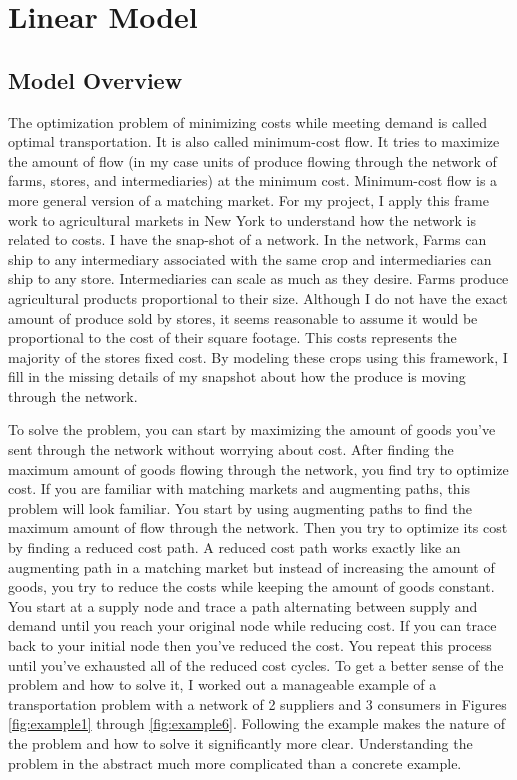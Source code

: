 \documentclass{report}
\begin{document}
\chapter{Linear Model}

\section{Model Overview}

The optimization problem of minimizing costs while meeting demand is called optimal transportation. It is also called minimum-cost flow. It tries to maximize the amount of flow (in my case units of produce flowing through the network of farms, stores, and intermediaries) at the minimum cost.  Minimum-cost flow is  a more general version of a matching market. For my project, I apply this frame work to agricultural markets in New York to understand how the network is related to costs. I have the snap-shot of a network. In the network, Farms can ship to any intermediary associated with the same crop and intermediaries can ship to any store. Intermediaries can scale as much as they desire. Farms produce agricultural products proportional to their size. Although I do not have the exact amount of produce sold by stores, it seems reasonable to assume it would be proportional to the cost of their square footage. This costs represents the majority of the stores fixed cost. By modeling these crops using this framework, I fill in the missing details of my snapshot about how the produce is moving through the network.

To solve the problem, you can start by maximizing the amount of goods you've sent through the network without worrying about cost.  After finding the maximum amount of goods flowing through the network, you find try to optimize cost.  If you are familiar with matching markets and augmenting paths, this problem will look familiar. You start by using augmenting paths to find the maximum amount of flow through the network. Then you try to optimize its cost by finding a reduced cost path. A reduced cost path works exactly like an augmenting path in a matching market but instead of increasing the amount of goods, you try to reduce the costs while keeping the amount of goods constant. You start at a supply node and trace a path alternating between supply and demand until you reach your original node while reducing cost. If you can trace back to your initial node then you've reduced the cost. You repeat this process until you've exhausted all of the reduced cost cycles. To get a better sense of the problem and how to  solve it, I worked out a  manageable example of a transportation problem with a network of 2 suppliers and 3 consumers in Figures \ref{fig:example1} through \ref{fig:example6}. Following the example makes the nature of the problem and how to solve it significantly more clear. Understanding the problem in the abstract much more complicated than a concrete example.
\end{document}
